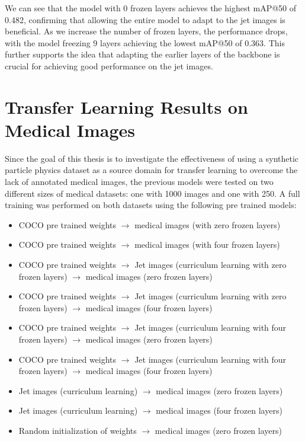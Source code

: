 We can see that the model with 0 frozen layers achieves the highest mAP@50 of 0.482, confirming that allowing the entire model to adapt to the jet images is beneficial. As we increase the number of frozen layers, the performance drops, with the model freezing 9 layers achieving the lowest mAP@50 of 0.363. This further supports the idea that adapting the earlier layers of the backbone is crucial for achieving good performance on the jet images.
\newpage
\section{Transfer Learning Results on Medical Images}
Since the goal of this thesis is to investigate the effectiveness of using a synthetic particle physics dataset as a source domain for transfer learning to overcome the lack of annotated medical images, the previous models were tested on two different sizes of medical datasets: one with 1000 images and one with 250. 
A full training was performed on both datasets using the following pre trained models: 
\begin{itemize}
    \item COCO pre trained weights $\to$ medical images (with zero frozen layers)
    \item COCO pre trained weights $\to$ medical images (with four frozen layers)
    \item COCO pre trained weights $\to$ Jet images (curriculum learning with zero frozen layers) $\to$ medical images (zero frozen layers)
    \item COCO pre trained weights $\to$ Jet images (curriculum learning with zero frozen layers) $\to$ medical images (four frozen layers)
    \item COCO pre trained weights $\to$ Jet images (curriculum learning with four frozen layers) $\to$ medical images (zero frozen layers)
    \item COCO pre trained weights $\to$ Jet images (curriculum learning with four frozen layers) $\to$ medical images (four frozen layers)
    \item Jet images (curriculum learning) $\to$ medical images (zero frozen layers)
    \item Jet images (curriculum learning) $\to$ medical images (four frozen layers)
    \item Random initialization of weights $\to$ medical images (zero frozen layers)
\end{itemize}

